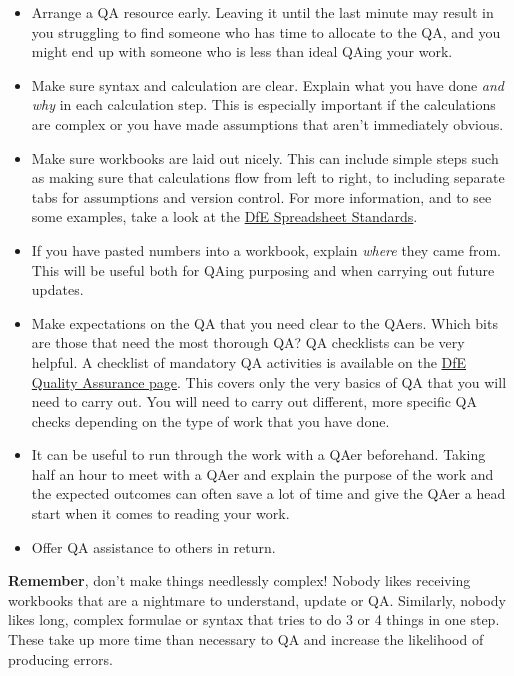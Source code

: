 \documentclass[
]{article}
\begin{document}
\begin{itemize}
\item
  Arrange a QA resource early. Leaving it until the last minute may result in you struggling to find someone who has time to allocate to the QA, and you might end up with someone who is less than ideal QAing your work.
\item
  Make sure syntax and calculation are clear. Explain what you have done \emph{and why} in each calculation step. This is especially important if the calculations are complex or you have made assumptions that aren't immediately obvious.
\item
  Make sure workbooks are laid out nicely. This can include simple steps such as making sure that calculations flow from left to right, to including separate tabs for assumptions and version control. For more information, and to see some examples, take a look at the \href{https://dfe-analytical-services.github.io/spreadsheet-standards/}{DfE Spreadsheet Standards}.
\item
  If you have pasted numbers into a workbook, explain \emph{where} they came from. This will be useful both for QAing purposing and when carrying out future updates.
\item
  Make expectations on the QA that you need clear to the QAers. Which bits are those that need the most thorough QA? QA checklists can be very helpful. A checklist of mandatory QA activities is available on the \href{https://educationgovuk.sharepoint.com/sites/sarpi/g/SitePages/Quality-Assurance.aspx}{DfE Quality Assurance page}. This covers only the very basics of QA that you will need to carry out. You will need to carry out different, more specific QA checks depending on the type of work that you have done.
\item
  It can be useful to run through the work with a QAer beforehand. Taking half an hour to meet with a QAer and explain the purpose of the work and the expected outcomes can often save a lot of time and give the QAer a head start when it comes to reading your work.
\item
  Offer QA assistance to others in return.
\end{itemize}

\textbf{Remember}, don't make things needlessly complex! Nobody likes receiving workbooks that are a nightmare to understand, update or QA. Similarly, nobody likes long, complex formulae or syntax that tries to do 3 or 4 things in one step. These take up more time than necessary to QA and increase the likelihood of producing errors.
\end{document}
